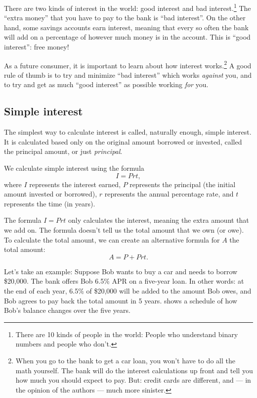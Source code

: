 There are two kinds of interest in the world: good interest and bad interest.\footnote{There are 10 kinds of people in the world: People who understand binary numbers and people who don't.} The ``extra money'' that you have to pay to the bank is ``bad interest''. On the other hand, some savings accounts earn interest, meaning that every so often the bank will add on a percentage of however much money is in the account. This is ``good interest'': free money!

As a future consumer, it is important to learn about how interest works.\footnote{When you go to the bank to get a car loan, you won't have to do all the math yourself. The bank will do the interest calculations up front and tell you how much you should expect to pay. But: credit cards are different, and --- in the opinion of the authors --- much more sinister.} A good rule of thumb is to try and minimize ``bad interest'' which works \textit{against} you, and to try and get as much ``good interest'' as possible working \textit{for} you.

\subsection{Simple interest}

The simplest way to calculate interest is called, naturally enough, \gls{simple interest}. It is calculated based only on the original amount borrowed or invested, called the \gls{principal amount}, or just \textit{principal}.

\begin{boxeddef}
We calculate simple interest using the formula \[I = Prt,\] where $I$ represents the interest earned, $P$ represents the principal (the initial amount invested or borrowed), $r$ represents the annual percentage rate, and $t$ represents the time (in years).
\end{boxeddef}

The formula $I=Prt$ only calculates the interest, meaning the extra amount that we add on. The formula doesn't tell us the total amount that we own (or owe). To calculate the total amount, we can create an alternative formula for $A$ the total amount: \[A = P +Prt.\]

Let's take an example: Suppose Bob wants to buy a car and needs to borrow \$20,000. The bank offers Bob 6.5\% APR on a five-year loan. In other words: at the end of each year, 6.5\% of \$20,000 will be added to the amount Bob owes, and Bob agrees to pay back the total amount in 5 years.  shows a schedule of how Bob's balance changes over the five years.

